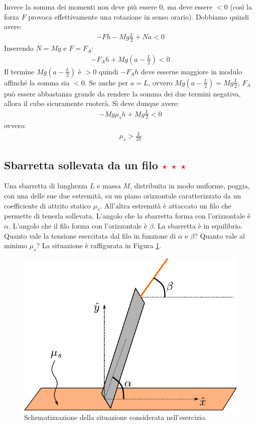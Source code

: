 \documentclass[12pt,a4paper]{book}
\newcommand{\rstar}{ \textcolor{red}{$\star$}}
\begin{document}
Invece la somma dei momenti non deve più essere $0$, ma deve essere $<0$ (così la forza $F$ provoca effettivamente una rotazione in senso orario). Dobbiamo quindi avere: 
\begin{gather*}
-F h - Mg \frac{L}{2} + N a <0
\end{gather*}
Inserendo $N=Mg$ e $F=F_A$:
\begin{gather*}
-F_A h + Mg(a- \frac{L}{2})<0
\end{gather*}
Il termine $Mg(a- \frac{L}{2})$ è $>0$ quindi $-F_A h$ deve esserne maggiore in modulo affinché la somma sia $<0$. 
Se anche per $a=L$, ovvero $Mg(a- \frac{L}{2})=Mg\frac{L}{2}$, $F_A$ può essere abbastanza grande da rendere la somma dei due termini 
negativa, allora il cubo sicuramente ruoterà. Si deve dunque avere:
\begin{gather*}
-Mg \mu_s h + Mg\frac{L}{2}<0
\end{gather*}
ovvero:
\begin{gather*}
\mu_s>\frac{L}{2h}
\end{gather*}



\subsection{Sbarretta sollevata da un filo \rstar \rstar \rstar}
Una sbarretta di lunghezza $L$ e massa $M$, distribuita in modo uniforme, poggia, con una delle sue due estremità, su un piano orizzontale caratterizzato da un coefficiente di attrito statico $\mu_s$. All'altra estremità è attaccato un filo che permette di tenerla sollevata. L'angolo che la sbarretta forma con l'orizzontale è $\alpha$.  L'angolo che il filo forma con l'orizzontale è $\beta$. La sbarretta è in equilibrio. Quanto vale la tensione esercitata dal filo in funzione di $\alpha$ e $\beta$? Quanto vale al minimo $\mu_s$? La situazione è raffigurata in Figura \ref{fig:sbar1}.

\begin{figure}[!ht]
\centering
\includegraphics[scale=1]{sbar1.pdf}
\caption{Schematizzazione della situazione considerata nell'esercizio. \label{fig:sbar1}}
\end{figure}
\end{document}
